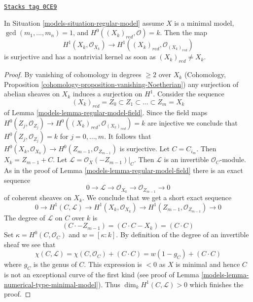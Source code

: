 \begin{lemma}
\label{models-lemma-genus-reduction-smaller}
\href{https://stacks.math.columbia.edu/tag/0CE9}{\texttt{Stacks tag 0CE9}}

In Situation \ref{models-situation-regular-model} assume $X$ is a minimal model,
$\gcd(m_1, \ldots, m_n) = 1$, and $H^0((X_k)_{red}, \mathcal{O}) = k$. Then
the map
$$
H^1(X_k, \mathcal{O}_{X_k}) \to H^1((X_k)_{red}, \mathcal{O}_{(X_k)_{red}})
$$
is surjective and has a nontrivial kernel as soon as $(X_k)_{red} \not = X_k$.
\end{lemma}

\begin{proof}

By vanishing of cohomology in degrees $\geq 2$ over $X_k$
(Cohomology, Proposition \ref{cohomology-proposition-vanishing-Noetherian})
any surjection of abelian sheaves on $X_k$ induces a surjection on $H^1$.
Consider the sequence
$$
(X_k)_{red} = Z_0 \subset Z_1 \subset \ldots \subset Z_m = X_k
$$
of Lemma \ref{models-lemma-regular-model-field}. Since the field maps
$H^0(Z_j, \mathcal{O}_{Z_j}) \to
H^0((X_k)_{red}, \mathcal{O}_{(X_k)_{red}}) = k$
are injective we conclude that $H^0(Z_j, \mathcal{O}_{Z_j}) = k$ for
$j = 0, \ldots, m$. It follows that
$H^0(X_k, \mathcal{O}_{X_k}) \to H^0(Z_{m - 1}, \mathcal{O}_{Z_{m - 1}})$
is surjective. Let $C = C_{i_m}$. Then $X_k = Z_{m - 1} + C$.
Let $\mathcal{L} = \mathcal{O}_X(-Z_{m - 1})|_C$.
Then $\mathcal{L}$ is an invertible $\mathcal{O}_C$-module.
As in the proof of Lemma \ref{models-lemma-regular-model-field}
there is an exact sequence
$$
0 \to \mathcal{L} \to \mathcal{O}_{X_k} \to \mathcal{O}_{Z_{m - 1}} \to 0
$$
of coherent sheaves on $X_k$. We conclude that
we get a short exact sequence
$$
0 \to
H^1(C, \mathcal{L}) \to H^1(X_k, \mathcal{O}_{X_k}) \to
H^1(Z_{m - 1}, \mathcal{O}_{Z_{m - 1}}) \to 0
$$
The degree of $\mathcal{L}$ on $C$ over $k$ is
$$
(C \cdot -Z_{m - 1}) = (C \cdot C - X_k) = (C \cdot C)
$$
Set $\kappa = H^0(C, \mathcal{O}_C)$ and $w = [\kappa : k]$.
By definition of the degree of an invertible sheaf we see that
$$
\chi(C, \mathcal{L}) =
\chi(C, \mathcal{O}_C) + (C \cdot C) =
w(1 - g_C) + (C \cdot C)
$$
where $g_C$ is the genus of $C$. This expression is $< 0$ as $X$ is minimal
and hence $C$ is not an exceptional curve of the first kind
(see proof of Lemma \ref{models-lemma-numerical-type-minimal-model}).
Thus $\dim_k H^1(C, \mathcal{L}) > 0$ which finishes the proof.
\end{proof}

